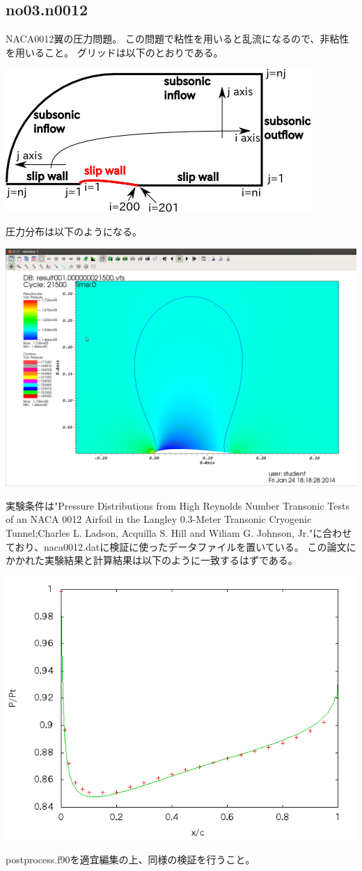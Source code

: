 \documentclass{jsarticle}
\begin{document}
\subsection{no03.n0012}%
NACA0012翼の圧力問題。
この問題で粘性を用いると乱流になるので、非粘性を用いること。
グリッドは以下のとおりである。
\begin{center}
\includegraphics[width=.6\textwidth,bb=0 0 439 205]{sample/no03.2.png}
\end{center}
圧力分布は以下のようになる。
\begin{center}
\includegraphics[width=.7\textwidth,bb=0 0 1556 1054]{sample/no03.png}
\end{center}
実験条件は"Pressure Distributions from High Reynolds Number Transonic Tests of an NACA 0012 Airfoil in the Langley 0.3-Meter Transonic Cryogenic Tunnel;Charles L. Ladson, Acquilla S. Hill and Wiliam G. Johnson, Jr."に合わせており、naca0012.datに検証に使ったデータファイルを置いている。
この論文にかかれた実験結果と計算結果は以下のように一致するはずである。
\begin{center}
\includegraphics[width=.7\textwidth,bb=0 0 640 480]{sample/no03.1.png}
\end{center}
postprocess.f90を適宜編集の上、同様の検証を行うこと。
\end{document}
